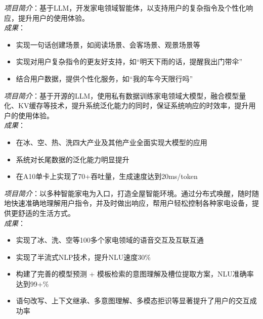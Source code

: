 \documentclass{resume}
\begin{document}

\begin{onehalfspacing}
\emph{项目简介}：基于LLM，开发家电领域智能体，以支持用户的复杂指令及个性化响应，提升用户的使用体验。
\\
\emph{成果}：
\begin{itemize}
  \item 实现一句话创建场景，如阅读场景、会客场景、观景场景等
  \item 实现对用户复杂指令的更友好支持，如“明天下雨的话，提醒我出门带伞”
  \item 结合用户数据，提供个性化服务，如“我的车今天限行吗”
\end{itemize}
\end{onehalfspacing}



\begin{onehalfspacing}
\emph{项目简介}：基于开源的LLM，使用私有数据训练家电领域大模型，融合模型量化、KV缓存等技术，提升系统泛化能力的同时，保证系统响应的时效率，提升用户的使用体验。
\\
\emph{成果}：
\begin{itemize}
  \item 在冰、空、热、洗四大产业及其他产业全面实现大模型的应用
  \item 系统对长尾数据的泛化能力明显提升
  \item 在A10单卡上实现了70+吞吐量，生成速度达到20ms/token
\end{itemize}
\end{onehalfspacing}



\begin{onehalfspacing}
\emph{项目简介}：以多种智能家电为入口，打造全屋智能环境。通过分布式唤醒，随时随地快速准确地理解用户指令，并及时做出响应，帮用户轻松控制各种家电设备，提供更舒适的生活方式。
\\
\emph{成果}：
\begin{itemize}
  \item 实现了冰、洗、空等100多个家电领域的语音交互及互联互通
  \item 实现了半流式NLP技术，提升NLU速度30\%
  \item 构建了完善的模型预测 + 模板检索的意图理解及槽位提取方案，NLU准确率达到99+\%
  \item 语句改写、上下文继承、多意图理解、多模态拒识等显著提升了用户的交互成功率
\end{itemize}
\end{onehalfspacing}
\end{document}
